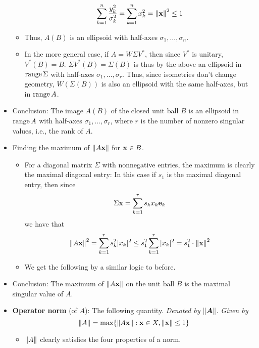 \documentclass[../../notes.tex]{subfiles}
\begin{document}
\begin{itemize}
\begin{itemize}
\begin{equation*}
            \sum_{k=1}^n\frac{y_k^2}{\sigma_k^2} = \sum_{k=1}^nx_k^2 = \norm{\mathbf{x}}^2 \leq 1
        \end{equation*}
        \item Thus, $A(B)$ is an ellipsoid with half-axes $\sigma_1,\dots,\sigma_n$.
        \item In the more general case, if $A=W\Sigma V^*$, then since $V^*$ is unitary, $V^*(B)=B$. $\Sigma V^*(B)=\Sigma(B)$ is thus by the above an ellipsoid in $\operatorname{range}\Sigma$ with half-axes $\sigma_1,\dots,\sigma_r$. Thus, since isometries don't change geometry, $W(\Sigma(B))$ is also an ellipsoid with the same half-axes, but in $\operatorname{range} A$.
    \end{itemize}
    \item Conclusion: The image $A(B)$ of the closed unit ball $B$ is an ellipsoid in $\operatorname{range} A$ with half-axes $\sigma_1,\dots,\sigma_r$, where $r$ is the number of nonzero singular values, i.e., the rank of $A$.
    \item Finding the maximum of $\norm{A\mathbf{x}}$ for $\mathbf{x}\in B$.
    \begin{itemize}
        \item For a diagonal matrix $\Sigma$ with nonnegative entries, the maximum is clearly the maximal diagonal entry: In this case if $s_1$ is the maximal diagonal entry, then since
        \begin{equation*}
            \Sigma\mathbf{x} = \sum_{k=1}^rs_kx_k\mathbf{e}_k
        \end{equation*}
        we have that
        \begin{equation*}
            \norm{A\mathbf{x}}^2 = \sum_{k=1}^rs_k^2|x_k|^2
            \leq s_1^2\sum_{k=1}^r|x_k|^2\\
            = s_1^2\cdot\norm{\mathbf{x}}^2
        \end{equation*}
        \item We get the following by a similar logic to before.
    \end{itemize}
    \item Conclusion: The maximum of $\norm{A\mathbf{x}}$ on the unit ball $B$ is the maximal singular value of $A$.
    \item \textbf{Operator norm} (of $A$): The following quantity. \emph{Denoted by} $\norm{\bm{A}}$. \emph{Given by}
    \begin{equation*}
        \norm{A} = \max\{\norm{A\mathbf{x}}:\mathbf{x}\in X,\norm{\mathbf{x}}\leq 1\}
    \end{equation*}
    \begin{itemize}
        \item $\norm{A}$ clearly satisfies the four properties of a norm.

\end{itemize}
\end{itemize}
\end{document}
